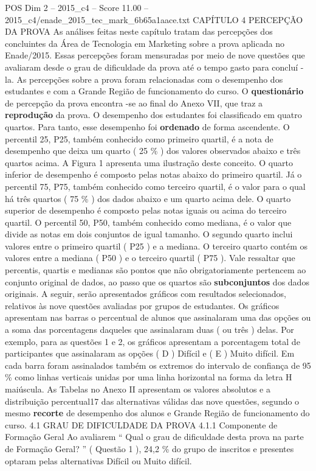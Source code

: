 \begin{textsample}{POS Dim 2 – 2015\_c4 – Score 11.00 – 2015\_c4/enade\_2015\_tec\_mark\_6b65a1aace.txt}  \label{ex:f2_pos_082}
CAPÍTULO 4 PERCEPÇÃO DA PROVA As análises feitas neste capítulo tratam das percepções dos concluintes da Área de Tecnologia em Marketing sobre a prova aplicada no Enade/2015.
Essas percepções foram mensuradas por meio de nove questões que avaliaram desde o grau de dificuldade da prova até o tempo gasto para concluí -la.
As percepções sobre a prova foram relacionadas com o desempenho dos estudantes e com a Grande Região de funcionamento do curso.
O \textbf{questionário} de percepção da prova encontra -se ao final do Anexo VII, que traz a \textbf{reprodução} da prova.
O desempenho dos estudantes foi classificado em quatro quartos.
Para tanto, esse desempenho foi \textbf{ordenado} de forma ascendente.
O percentil 25, P25, também conhecido como primeiro quartil, é a nota de desempenho que deixa um quarto ( 25 \% ) dos valores observados abaixo e três quartos acima.
A Figura 1 apresenta uma ilustração deste conceito.
O quarto inferior de desempenho é composto pelas notas abaixo do primeiro quartil.
Já o percentil 75, P75, também conhecido como terceiro quartil, é o valor para o qual há três quartos ( 75 \% ) dos dados abaixo e um quarto acima dele.
O quarto superior de desempenho é composto pelas notas iguais ou acima do terceiro quartil.
O percentil 50, P50, também conhecido como mediana, é o valor que divide as notas em dois conjuntos de igual tamanho.
O segundo quarto inclui valores entre o primeiro quartil ( P25 ) e a mediana.
O terceiro quarto contém os valores entre a mediana ( P50 ) e o terceiro quartil ( P75 ).
Vale ressaltar que percentis, quartis e medianas são pontos que não obrigatoriamente pertencem ao conjunto original de dados, ao passo que os quartos são \textbf{subconjuntos} dos dados originais.
A seguir, serão apresentados gráficos com resultados selecionados, relativos às nove questões avaliadas por grupos de estudantes.
Os gráficos apresentam nas barras o percentual de alunos que assinalaram uma das opções ou a soma das porcentagens daqueles que assinalaram duas ( ou três ) delas.
Por exemplo, para as questões 1 e 2, os gráficos apresentam a porcentagem total de participantes que assinalaram as opções ( D ) Difícil e ( E ) Muito difícil.
Em cada barra foram assinalados também os extremos do intervalo de confiança de 95 \% como linhas verticais unidas por uma linha horizontal na forma da letra H maiúscula.
As Tabelas no Anexo II apresentam os valores absolutos e a distribuição percentual17 das alternativas válidas das nove questões, segundo o mesmo \textbf{recorte} de desempenho dos alunos e Grande Região de funcionamento do curso. 4.1 GRAU DE DIFICULDADE DA PROVA 4.1.1 Componente de Formação Geral Ao avaliarem “ Qual o grau de dificuldade desta prova na parte de Formação Geral? ” ( Questão 1 ), 24,2 \% do grupo de inscritos e presentes optaram pelas alternativas Difícil ou Muito difícil.

\end{textsample}
